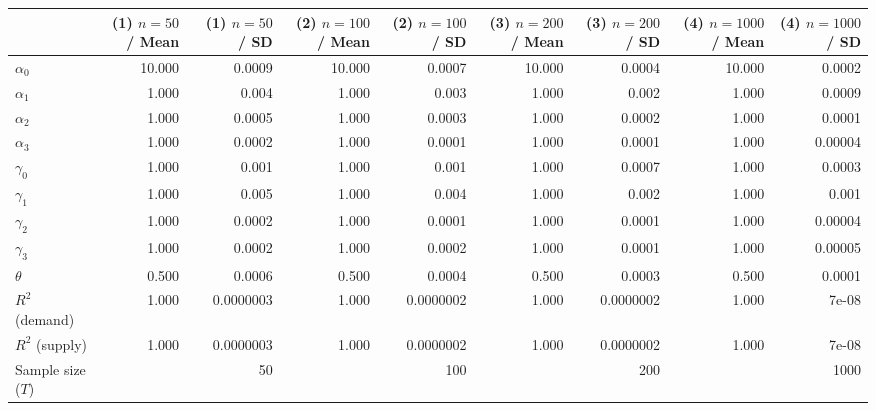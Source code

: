 
\begin{tabular}[t]{lrrrrrrrr}
\toprule
  & (1) $n=50$ / Mean & (1) $n=50$ / SD & (2) $n=100$ / Mean & (2) $n=100$ / SD & (3) $n=200$ / Mean & (3) $n=200$ / SD & (4) $n=1000$ / Mean & (4) $n=1000$ / SD\\
\midrule
$\alpha_{0}$ & 10.000 & 0.0009 & 10.000 & 0.0007 & 10.000 & 0.0004 & 10.000 & 0.0002\\
$\alpha_{1}$ & 1.000 & 0.004 & 1.000 & 0.003 & 1.000 & 0.002 & 1.000 & 0.0009\\
$\alpha_{2}$ & 1.000 & 0.0005 & 1.000 & 0.0003 & 1.000 & 0.0002 & 1.000 & 0.0001\\
$\alpha_{3}$ & 1.000 & 0.0002 & 1.000 & 0.0001 & 1.000 & 0.0001 & 1.000 & 0.00004\\
$\gamma_{0}$ & 1.000 & 0.001 & 1.000 & 0.001 & 1.000 & 0.0007 & 1.000 & 0.0003\\
$\gamma_{1}$ & 1.000 & 0.005 & 1.000 & 0.004 & 1.000 & 0.002 & 1.000 & 0.001\\
$\gamma_{2}$ & 1.000 & 0.0002 & 1.000 & 0.0001 & 1.000 & 0.0001 & 1.000 & 0.00004\\
$\gamma_{3}$ & 1.000 & 0.0002 & 1.000 & 0.0002 & 1.000 & 0.0001 & 1.000 & 0.00005\\
$\theta$ & 0.500 & 0.0006 & 0.500 & 0.0004 & 0.500 & 0.0003 & 0.500 & 0.0001\\
$R^{2}$ (demand) & 1.000 & 0.0000003 & 1.000 & 0.0000002 & 1.000 & 0.0000002 & 1.000 & 7e-08\\
$R^{2}$ (supply) & 1.000 & 0.0000003 & 1.000 & 0.0000002 & 1.000 & 0.0000002 & 1.000 & 7e-08\\
Sample size ($T$) &  & 50 &  & 100 &  & 200 &  & 1000\\
\bottomrule
\end{tabular}

